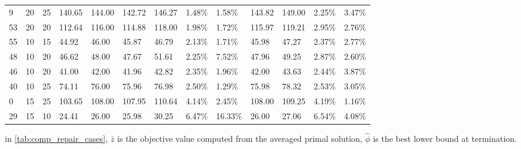 \begin{longtable}{l|ll|ll|llll|llll}
  9  & 20                         & 25                         & 140.65                    & 144.00        & 142.72 & 146.27 & 1.48\%  & 1.58\%  & 143.82 & 149.00 & 2.25\%  & 3.47\%  \\
  53 & 20                         & 20                         & 112.64                    & 116.00        & 114.88 & 118.00 & 1.98\%  & 1.72\%  & 115.97 & 119.21 & 2.95\%  & 2.76\%  \\
  55 & 10                         & 15                         & 44.92                     & 46.00         & 45.87  & 46.79  & 2.13\%  & 1.71\%  & 45.98  & 47.27  & 2.37\%  & 2.77\%  \\
  48 & 10                         & 20                         & 46.62                     & 48.00         & 47.67  & 51.61  & 2.25\%  & 7.52\%  & 47.96  & 49.25  & 2.87\%  & 2.60\%  \\
  46 & 10                         & 20                         & 41.00                     & 42.00         & 41.96  & 42.82  & 2.35\%  & 1.96\%  & 42.00  & 43.63  & 2.44\%  & 3.87\%  \\
  40 & 10                         & 25                         & 74.11                     & 76.00         & 75.96  & 76.98  & 2.50\%  & 1.29\%  & 75.98  & 78.32  & 2.53\%  & 3.05\%  \\
  0  & 15                         & 25                         & 103.65                    & 108.00        & 107.95 & 110.64 & 4.14\%  & 2.45\%  & 108.00 & 109.25 & 4.19\%  & 1.16\%  \\
  29 & 15                         & 10                         & 24.41                     & 26.00         & 25.98  & 30.25  & 6.47\%  & 16.33\% & 26.00  & 27.06  & 6.54\%  & 4.08\%  \\
  \bottomrule
\end{longtable}

\small
in \ref{tab:comp_repair_cases}, $\bar z$ is the objective value computed from
the averaged primal solution,
$\hat \phi$ is the best lower bound at termination.

\normalsize
